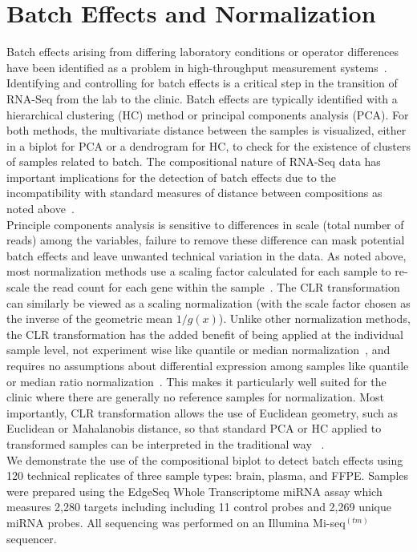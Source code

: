\documentclass{article}\usepackage[]{graphicx}\usepackage[]{color}
\theoremstyle{definition}
\begin{document}
\FloatBarrier
\section{Batch Effects and Normalization}

Batch effects arising from differing laboratory conditions or operator differences have been identified as a problem in high-throughput measurement systems~\cite{leek2010, chen2011}.  Identifying and controlling for batch effects is a critical step in the transition of RNA-Seq from the lab to the clinic.  Batch effects are typically identified with a hierarchical clustering (HC) method or principal components analysis (PCA).  For both methods, the multivariate distance between the samples is visualized, either in a biplot for PCA or a dendrogram for HC, to check for the existence of clusters of samples related to batch.
The compositional nature of RNA-Seq data has important implications for the detection of batch effects due to the incompatibility with standard measures of distance between compositions as noted above~\cite{Aitchison1986,Martin-Fernandez1998}.\\  

Principle components analysis is sensitive to differences in scale (total number of reads) among the variables, failure to remove these difference can mask potential batch effects and leave unwanted technical variation in the data.  As noted above, most normalization methods use a scaling factor calculated for each sample to re-scale the read count for each gene within the sample~\cite{Dillies2013}.  The CLR transformation can similarly be viewed as a scaling normalization (with the scale factor chosen as the inverse of the geometric mean $1/g(x)$).  Unlike other normalization methods, the CLR transformation has the added benefit of being applied at the individual sample level, not experiment wise like quantile or median normalization~\cite{Bolstad2003}, and requires no assumptions about differential expression among samples like quantile or median ratio normalization~\cite{Robinson2010,Anders2010}.  This makes it particularly well suited for the clinic where there are generally no reference samples for normalization.  Most importantly, CLR transformation allows the use of Euclidean geometry, such as Euclidean or Mahalanobis distance, so that standard PCA or HC applied to transformed samples can be interpreted in the traditional way~\cite{Aitchison2002} .\\

We demonstrate the use of the compositional biplot to detect batch effects using 120 technical replicates of three sample types: brain, plasma, and FFPE.  Samples were prepared using the EdgeSeq Whole Transcriptome miRNA assay which measures 2,280 targets including including 11 control probes and 2,269 unique miRNA probes.  All sequencing was performed on an Illumina Mi-seq$^{(tm)}$ sequencer.\\ 
\end{document}
